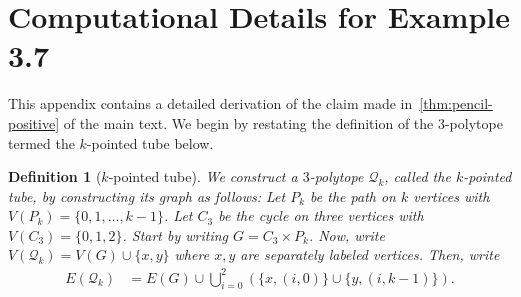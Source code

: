 \documentclass[11pt,a4paper]{amsart}
\newtheorem{definition}[theorem]{Definition}
\begin{document}
\appendix

\section{Computational Details for Example 3.7}\label{sec:appendix}

This appendix contains a detailed derivation of the claim made in~\cref{thm:pencil-positive} of the main text. We begin by restating the definition of the $3$-polytope termed the $k$-pointed tube below.

\begin{definition}[$k$-pointed tube]
    We construct a $3$-polytope $\mathcal{Q}_k$, called the \emph{$k$-pointed tube}, by constructing its graph as follows: Let $P_k$ be the path on $k$ vertices with $V(P_k) = \{0, 1, \dotsc, k-1\}$. Let $C_3$ be the cycle on three vertices with $V(C_3) = \{0, 1, 2\}$. Start by writing $G = C_3\times P_k$. Now, write $V(\mathcal{Q}_k) = V(G) \cup \{x, y\}$ where $x, y$ are separately labeled vertices. Then, write
    \begin{align*}
        E(\mathcal{Q}_k) &= E(G) \cup \bigcup_{i=0}^2 (\{x, (i, 0)\} \cup \{y, (i, k-1)\} ).
    \end{align*}
\end{definition}
\end{document}
